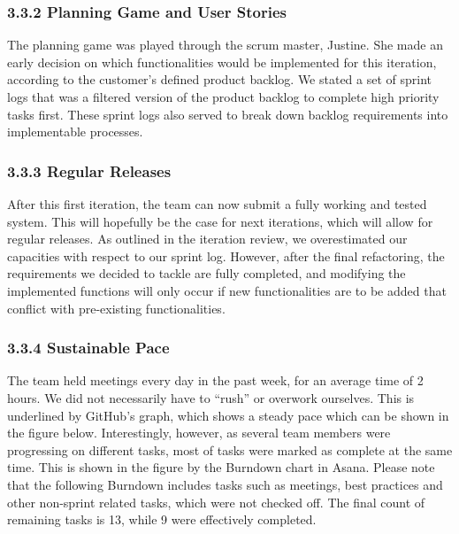 \documentclass[]{article}
\begin{document}
\subsubsection{3.3.2 Planning Game and User
Stories}\label{planning-game-and-user-stories}

The planning game was played through the scrum master, Justine. She made
an early decision on which functionalities would be implemented for this
iteration, according to the customer's defined product backlog. We
stated a set of sprint logs that was a filtered version of the product
backlog to complete high priority tasks first. These sprint logs also
served to break down backlog requirements into implementable processes.

\subsubsection{3.3.3 Regular Releases}\label{regular-releases}

After this first iteration, the team can now submit a fully working and
tested system. This will hopefully be the case for next iterations,
which will allow for regular releases. As outlined in the iteration
review, we overestimated our capacities with respect to our sprint log.
However, after the final refactoring, the requirements we decided to
tackle are fully completed, and modifying the implemented functions will
only occur if new functionalities are to be added that conflict with
pre-existing functionalities.

\subsubsection{3.3.4 Sustainable Pace}\label{sustainable-pace}

The team held meetings every day in the past week, for an average time
of 2 hours. We did not necessarily have to ``rush'' or overwork
ourselves. This is underlined by GitHub's graph, which shows a steady
pace which can be shown in the figure below. Interestingly, however, as several team members were progressing on different tasks, most of tasks were marked
as complete at the same time. This is shown in the figure by the
Burndown chart in Asana. Please note that the following Burndown includes tasks such as meetings, best practices and other non-sprint related tasks, which were not checked off. The final count of remaining tasks is 13, while 9 were effectively completed.
\end{document}
